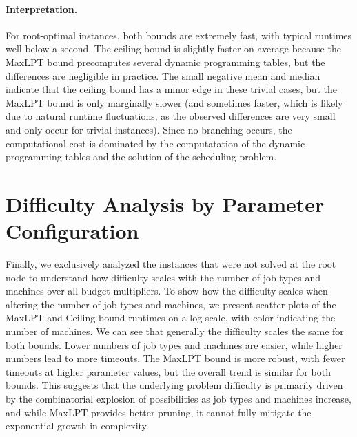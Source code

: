 \paragraph{Interpretation.}
For root-optimal instances, both bounds are extremely fast, 
with typical runtimes well below a second. 
The ceiling bound is slightly faster on average because the MaxLPT bound precomputes several dynamic programming tables, but the differences are negligible in practice. 
The small negative mean and median indicate that the ceiling bound has a minor edge in these trivial cases, 
but the MaxLPT bound is only marginally slower (and sometimes faster, which is likely due to natural runtime fluctuations, as the observed differences are very small and only occur for trivial instances). 
Since no branching occurs, the computational cost is dominated by the computatation of the dynamic programming tables and the solution of the scheduling problem. 


\section{Difficulty Analysis by Parameter Configuration}

Finally, we exclusively analyzed the instances that were not solved at the root node to understand how difficulty scales with the number of job types and machines over all budget multipliers.
To show how the difficulty scales when altering the number of job types and machines, we present scatter plots of the MaxLPT and Ceiling bound runtimes on a log scale, with color indicating the number of machines.
We can see that generally the difficulty scales the same for both bounds. 
Lower numbers of job types and machines are easier, while higher numbers lead to more timeouts. 
The MaxLPT bound is more robust, with fewer timeouts at higher parameter values, but the overall trend is similar for both bounds. 
This suggests that the underlying problem difficulty is primarily driven by the combinatorial explosion of possibilities as job types and machines increase, 
and while MaxLPT provides better pruning, it cannot fully mitigate the exponential growth in complexity.

